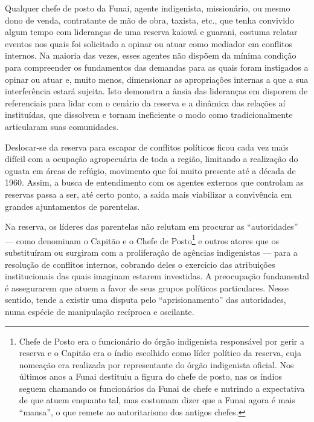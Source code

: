 \documentclass{article}
\begin{document}
Qualquer chefe de posto da Funai, agente indigenista, mission\'ario, ou
mesmo dono de venda, contratante de m\~ao de obra, taxista, etc., que
tenha convivido algum tempo com lideran\c{c}as de uma reserva kaiow\'a
e guarani, costuma relatar eventos nos quais foi solicitado a opinar ou
atuar como mediador em conflitos internos. Na maioria das vezes, esses
agentes n\~ao disp\~oem da m\'inima condi\c{c}\~ao para compreender os
fundamentos das demandas para as quais foram instigados a opinar ou
atuar e, muito menos, dimensionar as apropria\c{c}\~oes internas a que
a sua interfer\^encia estar\'a sujeita. Isto demonstra a \^ansia das
lideran\c{c}as em disporem de referenciais para lidar com o cen\'ario
da reserva e a din\^amica das rela\c{c}\~oes a\'i institu\'idas, que
dissolvem e tornam ineficiente o modo como tradicionalmente articularam
suas comunidades. 

Deslocar-se da reserva para escapar de conflitos pol\'iticos ficou cada
vez mais dif\'icil com a ocupa\c{c}\~ao agropecu\'aria de toda a
regi\~ao, limitando a realiza\c{c}\~ao do oguata em \'areas de
ref\'ugio, movimento que foi muito presente at\'e a d\'ecada de 1960.
Assim, a busca de entendimento com os agentes externos que controlam as
reservas passa a ser, at\'e certo ponto, a sa\'ida mais viabilizar a
conviv\^encia em grandes ajuntamentos de parentelas. 

Na reserva, os l\'ideres das parentelas n\~ao relutam em procurar as
{\textquotedblleft}autoridades{\textquotedblright} --- como denominam o
Capit\~ao e o Chefe de Posto\footnote{ Chefe de Posto era o
funcion\'ario do \'org\~ao indigenista respons\'avel por gerir a
reserva e o Capit\~ao era o \'indio escolhido como l\'ider pol\'itico
da reserva, cuja nomea\c{c}\~ao era realizada por representante do
\'org\~ao indigenista oficial. Nos \'ultimos anos a Funai destituiu a
figura do chefe de posto, nas os \'indios seguem chamando os
funcion\'arios da Funai de chefe e nutrindo a expectativa de que atuem
enquanto tal, mas costumam dizer que a Funai agora \'e mais
{\textquotedblleft}mansa{\textquotedblright}, o que remete ao
autoritarismo dos antigos chefes.} e outros atores que os
substitu\'iram ou surgiram com a prolifera\c{c}\~ao de ag\^encias
indigenistas --- para a resolu\c{c}\~ao de conflitos internos, cobrando
deles o exerc\'icio das atribui\c{c}\~oes institucionais das quais
imaginam estarem investidas. A preocupa\c{c}\~ao fundamental \'e
assegurarem que atuem a favor de seus grupos pol\'iticos particulares.
Nesse sentido, tende a existir uma disputa pelo
{\textquotedblleft}aprisionamento{\textquotedblright} das autoridades,
numa esp\'ecie de manipula\c{c}\~ao rec\'iproca e oscilante.
\end{document}
